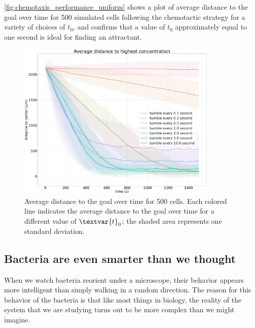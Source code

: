 \autoref{fig:chemotaxis_performance_uniform} shows a plot of average distance to the goal over time for 500 simulated cells following the chemotactic strategy for a variety of choices of $t_0$, and confirms that a value of $t_0$ approximately equal to one second is ideal for finding an attractant.


\begin{figure}[h]
\centering
\mySfFamily
\includegraphics[width = 0.85\textwidth]{../images/chemotaxis_performance_uniform.png}
\caption{Average distance to the goal over time for 500 cells. Each colored line indicates the average distance to the goal over time for a different value of $\textvar{t}_\text{0}$; the shaded area represents one standard deviation.}
\label{fig:chemotaxis_performance_uniform}
\end{figure}

%

\subsection{Bacteria are even smarter than we thought}

When we watch bacteria reorient under a microscope, their behavior appears more intelligent than simply walking in a random direction. The reason for this behavior of the bacteria is that like most things in biology, the reality of the system that we are studying turns out to be more complex than we might imagine.

